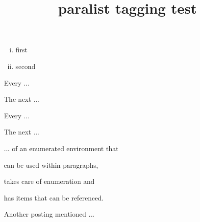 \documentclass{article}
\title{paralist tagging test}
\begin{document}
\begin{enumerate}[(i)]
\item first
\item second
\end{enumerate}

\begin{asparaenum}
\item Every ...
\item The next ...
\end{asparaenum}

\begin{compactenum}
\item Every ...
\item The next ...
\end{compactenum}

... of an enumerated environment that
\begin{inparaenum}[(a)]
\item can be used within paragraphs,
\item takes care of enumeration and
\item has items that can be referenced.
\end{inparaenum}
Another posting mentioned ...
\end{document}
